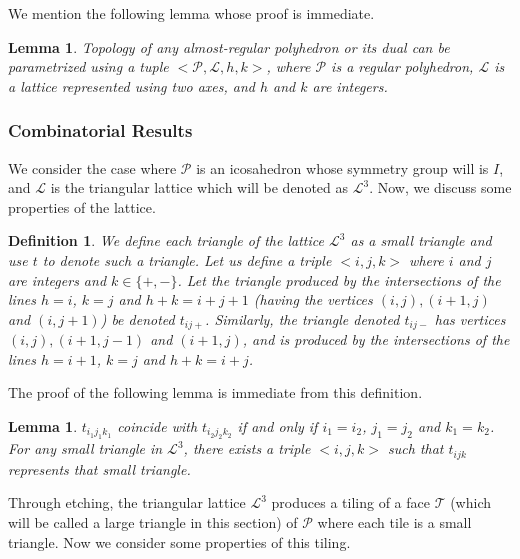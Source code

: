 \documentclass[11pt]{article}
\newtheorem{lemma}[thm]{Lemma}
\newtheorem{definition}[thm]{Definition}
\newcommand{\1}{\mathds{1}}
\begin{document}
We mention the following lemma whose proof is immediate.

\begin{lemma}
 Topology of any \emph{almost-regular} polyhedron or its dual can be parametrized using a tuple $<\mathcal{P},\mathcal{L},h,k>$, where $\mathcal{P}$ is a regular polyhedron, $\mathcal{L}$ is a lattice represented using two axes, and $h$ and $k$ are integers.
\end{lemma}



\subsubsection{Combinatorial Results}
We consider the case where $\mathcal{P}$ is an icosahedron whose symmetry group will is $I$, and $\mathcal{L}$ is the triangular lattice which will be denoted as $\mathcal{L}^3$. Now, we discuss some properties of the lattice.

\begin{definition}
We define each triangle of the lattice $\mathcal{L}^3$ as a small triangle and use $t$ to denote such a triangle. Let us define a triple $<i,j,k>$ where $i$ and $j$ are integers and $k \in \{+,-\}$. Let the triangle produced by the intersections of the lines $h=i$, $k=j$ and $h+k=i+j+1$ (having the vertices $(i,j), (i+1,j)$ and $(i, j+1)$) be denoted $t_{ij+}$. Similarly, the triangle denoted $t_{ij-}$ has vertices $(i,j), (i+1,j-1)$ and $(i+1, j)$, and is produced by the intersections of the lines $h=i+1$, $k=j$ and $h+k=i+j$. 
\label{def:smallt}
\end{definition}

The proof of the following lemma is immediate from this definition.

\begin{lemma}
$t_{i_1j_1k_1}$ coincide with $t_{i_2j_2k_2}$ if and only if $i_1 = i_2$, $j_1 = j_2$ and $k_1 = k_2$. For any small triangle in $\mathcal{L}^3$, there exists a triple $<i,j,k>$ such that $t_{ijk}$ represents that small triangle.
\end{lemma}

Through etching, the triangular lattice $\mathcal{L}^3$ produces a tiling of a face $\mathcal{T}$ (which will be called a large triangle in this section) of $\mathcal{P}$ where each tile is a small triangle. Now we consider some properties of this tiling.
\end{document}
